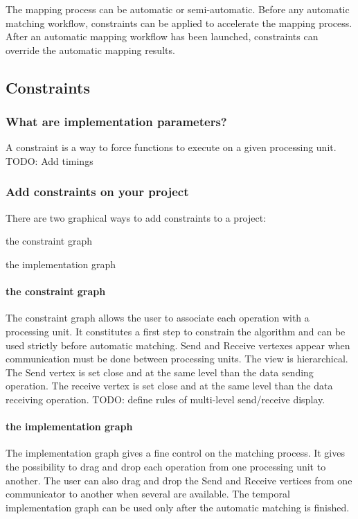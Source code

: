The mapping process can be automatic or semi-automatic. Before any automatic matching workflow, constraints can be applied to accelerate the mapping process. After an automatic mapping workflow has been launched, constraints can override the automatic mapping results.

\subsection{Constraints}
\subsubsection{What are implementation parameters?}

A constraint is a way to force functions to execute on a given processing unit.
TODO: Add timings 

\subsubsection{Add constraints on your project}

There are two graphical ways to add constraints to a project:

\itemize
\item the constraint graph 
\item the implementation graph 

\paragraph{the constraint graph}

The constraint graph allows the user to associate each operation with a processing unit. It constitutes a first step to constrain the algorithm and can be used strictly before automatic matching. Send and Receive vertexes appear when communication must be done between processing units. The view is hierarchical. The Send vertex is set close and at the same level than the data sending operation. The receive vertex is set close and at the same level than the data receiving operation.
TODO: define rules of multi-level send/receive display.

\paragraph{the implementation graph}

The implementation graph gives a fine control on the matching process. It gives the possibility to drag and drop each operation from one processing unit to another. The user can also drag and drop the Send and Receive vertices from one communicator to another when several are available. The temporal implementation graph can be used only after the automatic matching is finished.

